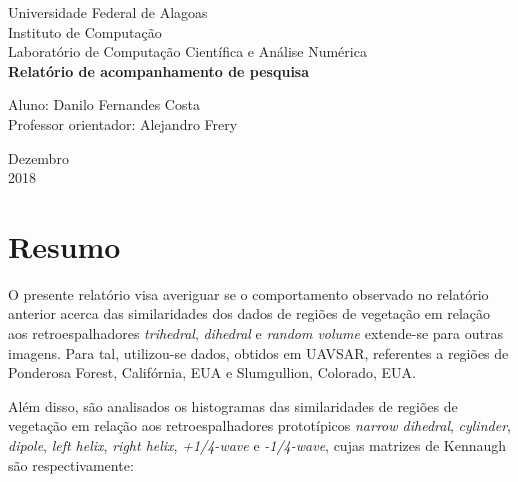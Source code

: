 \documentclass[12pt]{article}
\begin{document}

\onehalfspacing

\begin{titlepage}
	\begin{center}

		\Huge{Universidade Federal de Alagoas}\\
		\large{Instituto de Computação}\\ 
		\large{Laboratório de Computação Científica e Análise Numérica}\\ 
        \vspace{220pt}
        \textbf{\LARGE{Relatório de acompanhamento de pesquisa}}\\
		\vspace{3,5cm}
	\end{center}
	
	\begin{flushleft}
		\begin{tabbing}
			Aluno: Danilo Fernandes Costa\\
			Professor orientador: Alejandro Frery\\
	\end{tabbing}
 \end{flushleft}
	\vspace{1cm}
	
	\begin{center}
		\vspace{\fill}
			 Dezembro\\
		 2018
			\end{center}
\end{titlepage}

\section{Resumo}

O presente relatório visa averiguar se o comportamento observado no relatório anterior acerca das similaridades dos dados de regiões de vegetação em relação aos retroespalhadores \textit{trihedral}, \textit{dihedral} e \textit{random volume} extende-se para outras imagens. Para tal, utilizou-se dados, obtidos em UAVSAR, referentes a regiões de Ponderosa Forest, Califórnia, EUA e Slumgullion, Colorado, EUA. 

Além disso, são analisados os histogramas das similaridades de regiões de vegetação em relação aos retroespalhadores prototípicos \textit{narrow dihedral}, \textit{cylinder}, \textit{dipole}, \textit{left helix}, \textit{right helix}, \textit{+1/4-wave} e \textit{-1/4-wave}, cujas matrizes de Kennaugh são respectivamente:
\end{document}
